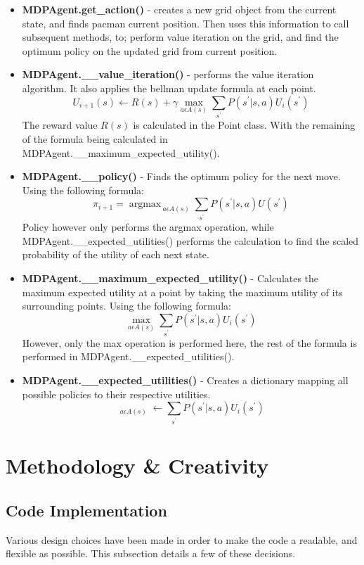 \documentclass[letterpaper, 11pt, journal, final]{IEEEtran}
\DeclareMathOperator*{\argmax}{argmax\,}
\DeclareMathOperator*{\dict}{dict[a]\!}
\begin{document}
\begin{itemize}
    \item \textbf{MDPAgent.get\_action()} - creates a new grid object from the current state, and finds pacman current position. Then uses this information to call subsequent methods, to; perform value iteration on the grid, and find the optimum policy on the updated grid from current position.
    \item \textbf{MDPAgent.\_\_value\_iteration()} - performs the value iteration algorithm\cite{Bel}. It also applies the bellman update formula at each point.
    \[U_{i+1}(s) \gets R(s) + \gamma \max_{a \epsilon A(s)}  \sum\limits_{s^\prime} P(s^\prime|s, a) U_i(s^\prime)\]
    The reward value \(R(s)\) is calculated in the Point class. With the remaining of the formula being calculated in MDPAgent.\_\_maximum\_expected\_utility().
    \item \textbf{MDPAgent.\_\_policy()} - Finds the optimum policy for the next move. Using the following formula:
    \[\pi_{i+1} = \argmax_{a \epsilon A(s)} \sum_{s^\prime} P(s^\prime | s, a)
    U(s^\prime)\]
    Policy however only performs the argmax operation, while MDPAgent.\_\_expected\_utilities()  performs the calculation to find the scaled probability of the utility of each next state.
    \item \textbf{MDPAgent.\_\_maximum\_expected\_utility()} - Calculates the maximum expected utility at a point by taking the maximum utility of its surrounding points. Using the following formula:
    \[\max_{a \epsilon A(s)}  \sum\limits_{s^\prime} P(s^\prime|s, a) U_i(s^\prime)\]
    However, only the max operation is performed here, the rest of the formula is performed in MDPAgent.\_\_expected\_utilities().
    \item \textbf{MDPAgent.\_\_expected\_utilities()} - Creates a dictionary mapping all possible policies to their respective utilities.
    \[ \dict_{a \epsilon A(s)} \gets \sum\limits_{s^\prime} P(s^\prime|s, a) U_i(s^\prime)\]
\end{itemize}

\section{Methodology \& Creativity}
\subsection{Code Implementation}
Various design choices have been made in order to make the code a readable, and flexible as possible. This subsection details a few of these decisions.
\end{document}
